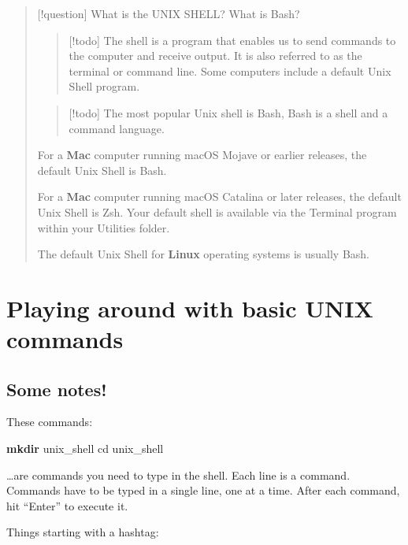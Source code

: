 \documentclass[
]{book}
\newenvironment{Shaded}{\begin{snugshade}}{\end{snugshade}}
\newcommand{\BuiltInTok}[1]{#1}
\newcommand{\FunctionTok}[1]{\textcolor[rgb]{0.13,0.29,0.53}{\textbf{#1}}}
\newcommand{\NormalTok}[1]{#1}
\begin{document}
\begin{quote}
{[}!question{]} What is the UNIX SHELL? What is Bash?

\begin{quote}
{[}!todo{]} The shell is a program that enables us to send commands to the computer and receive output. It is also referred to as the terminal or command line. Some computers include a default Unix Shell program.
\end{quote}

\begin{quote}
{[}!todo{]} The most popular Unix shell is Bash, Bash is a shell and a command language.
\end{quote}

For a \textbf{Mac} computer running macOS Mojave or earlier releases, the default Unix Shell is Bash.

For a \textbf{Mac} computer running macOS Catalina or later releases, the default Unix Shell is Zsh. Your default shell is available via the Terminal program within your Utilities folder.

The default Unix Shell for \textbf{Linux} operating systems is usually Bash.
\end{quote}

\hypertarget{playing-around-with-basic-unix-commands}{%
\section{Playing around with basic UNIX commands}\label{playing-around-with-basic-unix-commands}}

\hypertarget{some-notes}{%
\subsection{Some notes!}\label{some-notes}}

These commands:

\begin{Shaded}
\begin{Highlighting}[]
\FunctionTok{mkdir}\NormalTok{ unix\_shell}
\BuiltInTok{cd}\NormalTok{ unix\_shell}
\end{Highlighting}
\end{Shaded}

\ldots are commands you need to type in the shell.
Each line is a command.
Commands have to be typed in a single line, one at a time.
After each command, hit ``Enter'' to execute it.

Things starting with a hashtag:
\end{document}
